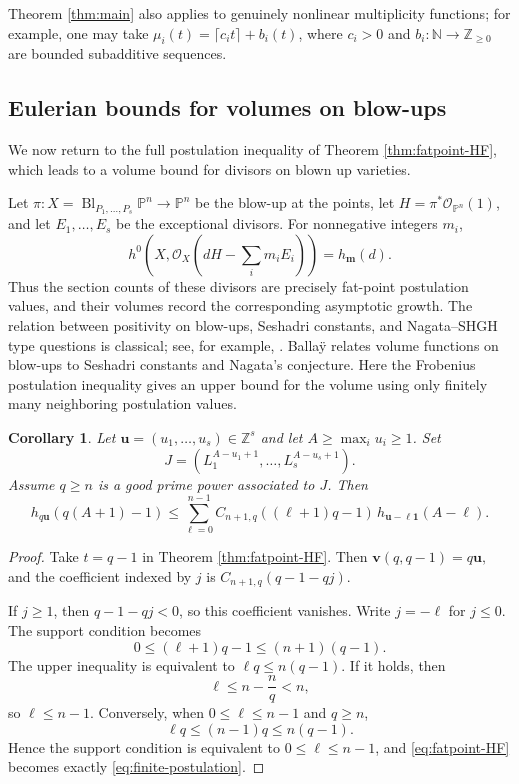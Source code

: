 \documentclass[11pt]{amsart}
\newtheorem{corollary}[theorem]{Corollary}
\theoremstyle{remark}
\newcommand{\PP}{\mathbb P}
\newcommand{\NN}{\mathbb N}
\newcommand{\ZZ}{\mathbb Z}
\begin{document}
Theorem \ref{thm:main} also applies to genuinely nonlinear multiplicity functions; for example, one may take $\mu_i(t)=\lceil c_it\rceil+b_i(t)$, where $c_i>0$ and $b_i:\NN\to\ZZ_{\ge0}$ are bounded subadditive sequences.


\subsection{Eulerian bounds for volumes on blow-ups}\label{sec:volumes}

We now return to the full postulation inequality of Theorem \ref{thm:fatpoint-HF}, which leads to a volume bound for divisors on blown up varieties.

Let
$
\pi:X=\operatorname{Bl}_{P_1,\ldots,P_s}\PP^n\longrightarrow\PP^n
$
be the blow-up at the points, let $H=\pi^*\mathcal O_{\PP^n}(1)$, and let $E_1,\ldots,E_s$ be the exceptional divisors. For nonnegative integers $m_i$,
$$
h^0\!\left(X,\mathcal O_X\left(dH-\sum_i m_iE_i\right)\right)
=
h_{\mathbf m}(d).
$$
Thus the section counts of these divisors are precisely fat-point postulation values, and their volumes record the corresponding asymptotic growth. The relation between positivity on blow-ups, Seshadri constants, and Nagata--SHGH type questions is classical; see, for example, \cite{BauerEtAl,DKMSHGH}. Balla\"y \cite{Ballay} relates volume functions on blow-ups to Seshadri constants and Nagata's conjecture. Here the Frobenius postulation inequality gives an upper bound for the volume using only finitely many neighboring postulation values.

\begin{corollary}\label{cor:finite-postulation}
Let $\mathbf u=(u_1,\ldots,u_s)\in\ZZ^s$ and let $A\ge\max_i u_i\ge1$. Set
$$
J=(L_1^{A-u_1+1},\ldots,L_s^{A-u_s+1}).
$$
Assume $q\ge n$ is a good prime power associated to $J$. Then
\begin{equation}\label{eq:finite-postulation}
h_{q\mathbf u}(q(A+1)-1)
\le
\sum_{\ell=0}^{n-1}
C_{n+1,q}((\ell+1)q-1)
\,h_{\mathbf u-\ell\mathbf1}(A-\ell).
\end{equation}
\end{corollary}

\begin{proof}
Take $t=q-1$ in Theorem \ref{thm:fatpoint-HF}. Then
$
\mathbf v(q,q-1)=q\mathbf u,
$
and the coefficient indexed by $j$ is
$
C_{n+1,q}(q-1-qj).
$

If $j\ge1$, then $q-1-qj<0$, so this coefficient vanishes. Write $j=-\ell$ for $j\le0$. The support condition becomes
$$
0\le(\ell+1)q-1\le(n+1)(q-1).
$$
The upper inequality is equivalent to
$
\ell q\le n(q-1).
$
If it holds, then
$$
\ell\le n-\frac nq<n,
$$
so $\ell\le n-1$. Conversely, when $0\le\ell\le n-1$ and $q\ge n$,
$$
\ell q\le(n-1)q\le n(q-1).
$$
Hence the support condition is equivalent to $0\le\ell\le n-1$, and \eqref{eq:fatpoint-HF} becomes exactly \eqref{eq:finite-postulation}.
\end{proof}
\end{document}
